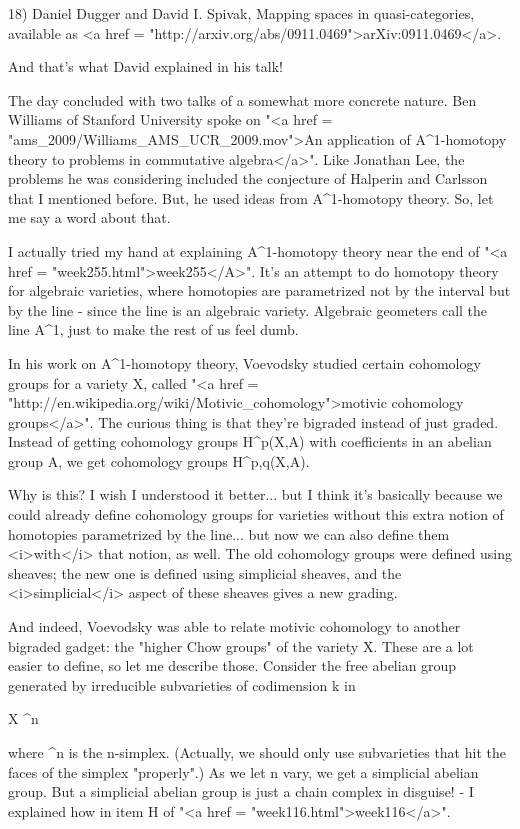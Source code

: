 18) Daniel Dugger and David I. Spivak, Mapping spaces in
quasi-categories, available as <a href = "http://arxiv.org/abs/0911.0469">arXiv:0911.0469</a>.

And that's what David explained in his talk!

The day concluded with two talks of a somewhat more concrete nature.
Ben Williams of Stanford University spoke on "<a href =
"ams_2009/Williams_AMS_UCR_2009.mov">An application of
A^{1}-homotopy theory to problems in commutative
algebra</a>".  Like Jonathan Lee, the problems he was considering
included the conjecture of Halperin and Carlsson that I mentioned
before.  But, he used ideas from A^{1}-homotopy theory.  So,
let me say a word about that.

I actually tried my hand at explaining A^{1}-homotopy theory
near the end of "<a href = "week255.html">week255</A>".
It's an attempt to do homotopy theory for algebraic varieties, where
homotopies are parametrized not by the interval but by the line -
since the line is an algebraic variety.  Algebraic geometers call
the line A^{1}, just to make the rest of us feel dumb.

In his work on A^{1}-homotopy theory, Voevodsky studied
certain cohomology groups for a variety X, called "<a href =
"http://en.wikipedia.org/wiki/Motivic_cohomology">motivic cohomology
groups</a>".  The curious thing is that they're bigraded instead
of just graded.  Instead of getting cohomology groups
H^{p}(X,A) with coefficients in an abelian group A, we get
cohomology groups H^{p,q}(X,A).

Why is this?  I wish I understood it better... but I think it's
basically because we could already define cohomology groups for
varieties without this extra notion of homotopies parametrized by
the line... but now we can also define them <i>with</i> that notion, as
well.  The old cohomology groups were defined using sheaves; the 
new one is defined using simplicial sheaves, and the <i>simplicial</i>
aspect of these sheaves gives a new grading.

And indeed, Voevodsky was able to relate motivic cohomology to another
bigraded gadget: the "higher Chow groups" of the variety X.
These are a lot easier to define, so let me describe those.  Consider
the free abelian group generated by irreducible subvarieties of
codimension k in 

X \times  \Delta ^{n}

where \Delta ^{n} is the n-simplex.  (Actually, we should
only use subvarieties that hit the faces of the simplex
"properly".)  As we let n vary, we get a simplicial abelian
group.  But a simplicial abelian group is just a chain complex in
disguise! - I explained how in item H of "<a href =
"week116.html">week116</a>".

